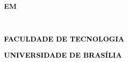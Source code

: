 
\setlength{\headsep}{10.2cm}

\thispagestyle{empty}
\begin{center}

{\LARGE{\bf \MakeUppercase{\ttitle}}}

\vspace{2cm}

{\large {\bf \MakeUppercase{\tauthor}}}

\vspace{1cm}


{\large {\bf \MakeUppercase{\tdoctype} \\
			 \MakeUppercase{em \tcourse}\\
			}}

\vspace{1cm}

{\large {\bf \MakeUppercase{\tdepartment}\\
}}

\vspace{3.5cm}

\textcolor{black}{\LARGE{\bf FACULDADE DE TECNOLOGIA }}


\vspace{1cm}

\textcolor{black}{\huge {\bf UNIVERSIDADE DE BRASÍLIA }}

\end{center}

\pagebreak


